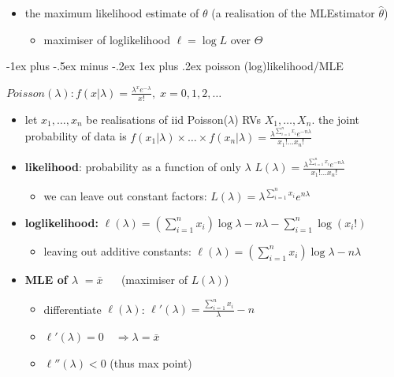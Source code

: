 \documentclass[10pt, landscape]{article}
\makeatletter
\renewcommand{\subsubsection}{\@startsection{subsubsection}{3}{0mm}%
  {-1ex plus -.5ex minus -.2ex}%
  {1ex plus .2ex}%
{\normalfont\small\bfseries}}%
\newcommand{\xbar}{\bar{x}}
\newcommand{\seq}[2][n]{#2_1, \dots, #2_{#1}}
\makeatother
\begin{document}
\begin{multicols*}{4}
  \begin{itemize}
    \item {} the maximum likelihood estimate of $\theta$ (a realisation of the MLEstimator $\hat\theta$)
      \begin{itemize}
        \item maximiser of loglikelihood $\ell = \log L$ over $\Theta$
      \end{itemize}
  \end{itemize}

  \subsubsection{poisson (log)likelihood/MLE}

  $Poisson(\lambda): f(x \vert \lambda) = \frac{\lambda^x e^{-\lambda}}{x!}, \; x = 0,1,2,\dots$

  \begin{itemize}
    \item let $\seq{x}$ be realisations of iid Poisson($\lambda$) RVs $\seq X$. 
      the joint probability of data is  $f(x_1 \vert \lambda) \times \dots \times f(x_n\vert \lambda) = \frac{\lambda^{\sum^n_{i=1} x_i} e^{-n\lambda}}{x_1! \dots x_n!}$
    \item \textbf{likelihood}: probability as a function of only $\lambda$ 
      $L(\lambda) = \frac{\lambda^{\sum^n_{i=1} x_i} e^{-n\lambda}}{x_1! \dots x_n!}$
      \begin{itemize}
        \item we can leave out constant factors: $L(\lambda) = \lambda^{\sum^n_{i=1}x_i} e^{n\lambda}$
      \end{itemize}
    \item \textbf{loglikelihood:} $\ell(\lambda) = (\sum^n_{i=1} x_i) \log \lambda - n\lambda - \sum^{n}_{i=1}\log(x_i!)$
      \begin{itemize}
        \item leaving out additive constants: $\ell(\lambda) = (\sum^n_{i=1}x_i) \log \lambda- n \lambda$
      \end{itemize}
    \item \textbf{MLE of $\lambda$} $= \xbar$ $\quad$ (maximiser of $L(\lambda)$)

      \begin{itemize}
        \item differentiate $\ell(\lambda)$: $\ell'(\lambda) = \frac{\sum^{n}_{i=1} x_i}{\lambda} - n$
        \item $\ell'(\lambda) = 0 \quad \Rightarrow \lambda = \xbar$ 
        \item $\ell''(\lambda) < 0$ (thus max point)
      \end{itemize}
  \end{itemize}


\end{multicols*}
\end{document}
